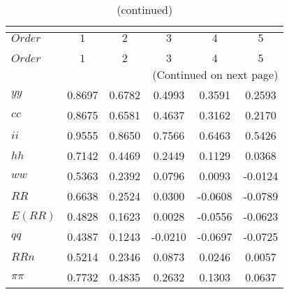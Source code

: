  
\begin{center}
\begin{longtable}{lccccc} 
\caption{COEFFICIENTS OF AUTOCORRELATION}\\
 \label{Table:th_autocorr_matrix}\\
\toprule 
$Order   $	 & 	 $         1$	 & 	 $         2$	 & 	 $         3$	 & 	 $         4$	 & 	 $         5$\\
\midrule \endfirsthead 
\caption{(continued)}\\
 \toprule \\ 
$Order   $	 & 	 $         1$	 & 	 $         2$	 & 	 $         3$	 & 	 $         4$	 & 	 $         5$\\
\midrule \endhead 
\midrule \multicolumn{6}{r}{(Continued on next page)} \\ \bottomrule \endfoot 
\bottomrule \endlastfoot 
$yy      $	 & 	    0.8697	 & 	    0.6782	 & 	    0.4993	 & 	    0.3591	 & 	    0.2593 \\ 
$cc      $	 & 	    0.8675	 & 	    0.6581	 & 	    0.4637	 & 	    0.3162	 & 	    0.2170 \\ 
$ii      $	 & 	    0.9555	 & 	    0.8650	 & 	    0.7566	 & 	    0.6463	 & 	    0.5426 \\ 
$hh      $	 & 	    0.7142	 & 	    0.4469	 & 	    0.2449	 & 	    0.1129	 & 	    0.0368 \\ 
$ww      $	 & 	    0.5363	 & 	    0.2392	 & 	    0.0796	 & 	    0.0093	 & 	   -0.0124 \\ 
$RR      $	 & 	    0.6638	 & 	    0.2524	 & 	    0.0300	 & 	   -0.0608	 & 	   -0.0789 \\ 
$E(RR)   $	 & 	    0.4828	 & 	    0.1623	 & 	    0.0028	 & 	   -0.0556	 & 	   -0.0623 \\ 
$qq      $	 & 	    0.4387	 & 	    0.1243	 & 	   -0.0210	 & 	   -0.0697	 & 	   -0.0725 \\ 
$RRn     $	 & 	    0.5214	 & 	    0.2346	 & 	    0.0873	 & 	    0.0246	 & 	    0.0057 \\ 
$\pi\pi  $	 & 	    0.7732	 & 	    0.4835	 & 	    0.2632	 & 	    0.1303	 & 	    0.0637 \\ 
\end{longtable}
 \end{center}
